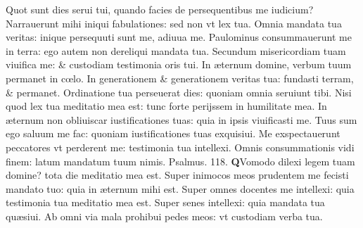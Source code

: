 \documentclass[a5paper,10pt]{book}
\def\ae{æ}
\def\oe{œ}
\begin{document}
\begin{multicols*}{2}
\newline \color{red} Q\color{black}uot sunt dies serui tui, quando facies de persequentibus me iudicium?
\newline \color{red} N\color{black}arrauerunt mihi iniqui fabulationes: sed non vt lex tua.
\newline \color{red} O\color{black}mnia mandata tua veritas: inique persequuti sunt me, adiuua me.
\newline \color{red} P\color{black}aulominus consummauerunt me in terra: ego autem non dereliqui mandata tua.
\newline \color{red} S\color{black}ecundum misericordiam tuam viuifica me: \& custodiam testimonia oris tui.
\newline \color{red} I\color{black}n \ae ternum domine, verbum tuum permanet in c\oe lo.
\newline \color{red} I\color{black}n generationem \& generationem veritas tua: fundasti terram, \& permanet.
\newline \color{red} O\color{black}rdinatione tua perseuerat dies: quoniam omnia seruiunt tibi.
\newline \color{red} N\color{black}isi quod lex tua meditatio mea est: tunc forte perijssem in humilitate mea.
\newline \color{red} I\color{black}n \ae ternum non obliuiscar iustificationes tuas: quia in ipsis viuificasti me.
\newline \color{red} T\color{black}uus sum ego saluum me fac: quoniam iustificationes tuas exquisiui.
\newline \color{red} M\color{black}e exspectauerunt peccatores vt perderent me: testimonia tua intellexi.
\newline \color{red} O\color{black}mnis consummationis vidi finem: latum mandatum tuum nimis. \quad \color{red} Psalmus. 118. \color{black}
\vspace{-1em}
\lettrine[lines=2]{\bfseries \color{red} Q}{}Vomodo dilexi legem tuam domine? tota die meditatio mea est.
\newline \color{red} S\color{black}uper inimocos meos prudentem me fecisti mandato tuo: quia in \ae ternum mihi est.
\newline \color{red} S\color{black}uper omnes docentes me intellexi: quia testimonia tua meditatio mea est.
\newline \color{red} S\color{black}uper senes intellexi: quia mandata tua qu\ae siui.
\newline \color{red} A\color{black}b omni via mala prohibui pedes meos: vt custodiam verba tua.

\end{multicols*}
\end{document}
